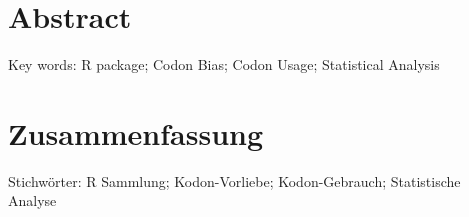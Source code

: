 

\cleardoublepage
\chapter*{Abstract}
\lipsum[1-2]
\vskip0.5cm
Key words: 
R package; Codon Bias; Codon Usage; Statistical Analysis



\cleardoublepage
\chapter*{Zusammenfassung}
\lipsum[1-2]
\vskip0.5cm
Stichwörter: 
R Sammlung; Kodon-Vorliebe; Kodon-Gebrauch; Statistische Analyse








